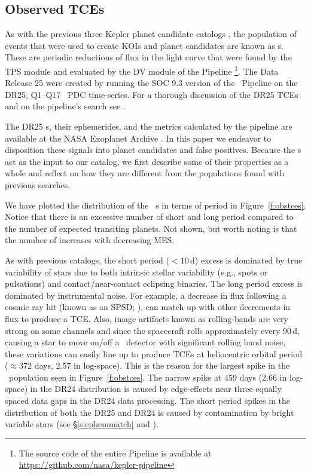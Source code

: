 \subsection{Observed TCEs}

\label{s:tces}
As with the previous three Kepler planet candidate catalogs \citep{Coughlin2016,Mullally2015cat,Rowe2015cat}, the population of events that were used to create KOIs and planet candidates are known as \opstce s. These are periodic reductions of flux in the light curve that were found by the TPS module and evaluated by the DV module of the \Kepler{} Pipeline \citep{JenkinsKDPH}\footnote{The source code of the entire Pipeline is available at \url{https://github.com/nasa/kepler-pipeline}}. The Data Release 25   were created by running the SOC 9.3 version of the \Kepler\ Pipeline on the DR25, Q1--Q17 \Kepler\ PDC time-series.  For a thorough discussion of the DR25 TCEs and on the pipeline's search see \citet{Twicken2016}. 

The DR25 \opstce s, their ephemerides, and the metrics calculated by the pipeline are available at the NASA Exoplanet Archive \citep{Akeson2013}.  In this paper we endeavor to disposition these signals into planet candidates and false positives.  Because the \opstce s act as the input to our catalog, we first describe some of their properties as a whole and reflect on how they are different from the \opstce{} populations found with previous searches.

We have plotted the distribution of the \ntcesnorogue\ \opstce s in terms of period in Figure~\ref{f:obstces}. Notice that there is an excessive number of short and long period  compared to the number of expected transiting planets. Not shown, but worth noting is that the number of  increases with decreasing MES.

As with previous catalogs, the short period ($<10$\,d) excess is dominated by true variability of stars due to both intrinsic stellar variability (e.g., spots or pulsations) and contact/near-contact eclipsing binaries. The long period excess is dominated by instrumental noise. For example, a decrease in flux following a cosmic ray hit (known as an SPSD; \citealt{KDCH}), can match up with other decrements in flux to produce a TCE. Also, image artifacts known as rolling-bands are very strong on some channels \citep[see \S6.7 of][]{KIH}  and since the spacecraft rolls approximately every 90\,d, causing a star to move on/off a \Kepler\ detector with significant rolling band noise, these variations can easily line up to produce TCEs at  heliocentric orbital period ($\approx$372 days, 2.57 in log-space). This is the reason for the largest spike in the \opstce\ population seen in Figure~\ref{f:obstces}. The narrow spike at 459 days (2.66 in log-space) in the DR24 \opstce{} distribution is caused by edge-effects near three equally spaced data gaps in the DR24 data processing.  The short period spikes in the distribution of both the DR25 and DR24  is caused by contamination by bright variable stars (see \S\ref{s:ephemmatch} and \citealt{Coughlin2014a}).

